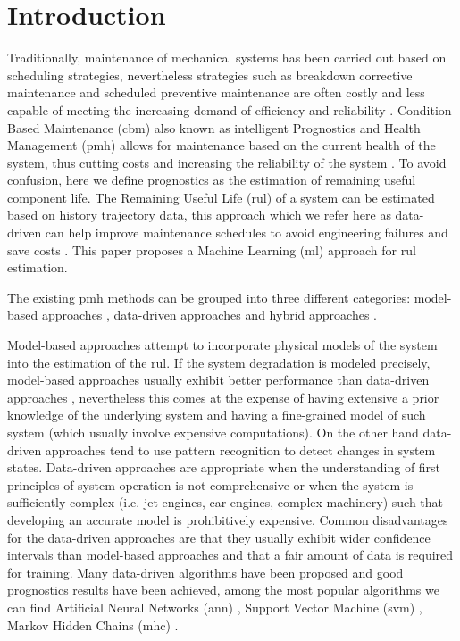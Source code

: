 \section{Introduction}

Traditionally, maintenance of mechanical systems has been carried out based on scheduling strategies, nevertheless strategies such as breakdown corrective maintenance and scheduled preventive maintenance are often costly and less capable of meeting the increasing demand of efficiency and reliability \cite{gebraeel_2005, zaidan_2013}. Condition Based Maintenance (\gls{cbm}) also known as intelligent Prognostics and Health Management (\gls{pmh}) allows for maintenance based on the current health of the system, thus cutting costs and increasing the reliability of the system \cite{zhao_2017}. To avoid confusion, here we define prognostics as the estimation of remaining useful component life. The Remaining Useful Life (\gls{rul}) of a system can be estimated based on history trajectory data, this approach which we refer here as data-driven can help improve maintenance schedules to avoid engineering failures and save costs \cite{lee_2014}. This paper proposes a Machine Learning (\gls{ml}) approach for \gls{rul} estimation.

The existing \gls{pmh} methods can be grouped into three different categories: model-based approaches \cite{yu_2001} , data-driven approaches \cite{liu_2009, mosallam_2013} and hybrid approaches \cite{pecht_2010, liu_2012}.

Model-based approaches attempt to incorporate physical models of the system into the estimation of the \gls{rul}. If the system degradation is modeled  precisely, model-based approaches usually exhibit better performance than data-driven approaches \cite{qian_2017}, nevertheless this comes at the expense of having extensive a prior knowledge of the underlying system and having a fine-grained model of such system (which usually involve expensive computations). On the other hand data-driven approaches tend to use pattern recognition to detect changes in system states. Data-driven approaches are appropriate when the understanding of first principles of system operation is not comprehensive or when the system is sufficiently complex (i.e. jet engines, car engines, complex machinery) such that developing an accurate model is prohibitively expensive. Common disadvantages for the data-driven approaches are that they usually exhibit wider confidence intervals than model-based approaches and that a fair amount of data is required for training. Many data-driven algorithms have been proposed and good prognostics results have been achieved, among the most popular algorithms we can find Artificial Neural Networks (\gls{ann}) \cite{gebraeel_2004}, Support Vector Machine (\gls{svm}) \cite{benkedjouh_2013}, Markov Hidden Chains (\gls{mhc}) \cite{dong_2007}.

